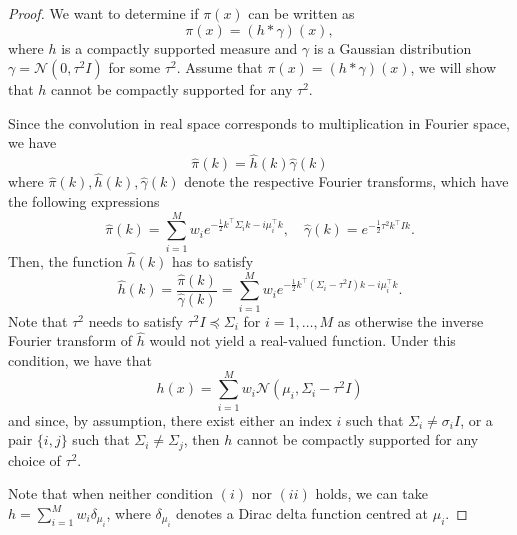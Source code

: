 \begin{proof}
We want to determine if $\pi(x)$ can be written as
\begin{equation*}
    \pi(x) = (h*\gamma)(x),
\end{equation*}
where $h$ is a compactly supported measure and $\gamma$ is a Gaussian distribution $\gamma = \mathcal{N}(0, \tau^2 I)$ for some $\tau^2$. 
Assume that $\pi(x) = (h*\gamma)(x)$, we will show that $h$ cannot be compactly supported for any $\tau^2$.

Since the convolution in real space corresponds to multiplication in Fourier space, we have
\begin{equation*}
    \hat{\pi}(k) = \hat{h}(k)\hat{\gamma}(k)
\end{equation*}
where $ \hat{\pi}(k), \hat{h}(k), \hat{\gamma}(k)$ denote the respective Fourier transforms, which have the following expressions
\begin{equation*}
    \hat{\pi}(k) = \sum_{i=1}^M w_i e^{-\frac{1}{2}k^{\intercal}\Sigma_i k - i \mu_i^{\intercal}k}, \quad  \hat{\gamma}(k) = e^{-\frac{1}{2}\tau^2 k^\intercal I k}.
\end{equation*}
Then, the function $\hat{h}(k)$ has to satisfy
\begin{equation*}
    \hat{h}(k) = \frac{\hat{\pi}(k) }{\hat{\gamma}(k)} = \sum_{i=1}^M w_i e^{-\frac{1}{2}k^\intercal (\Sigma_i-\tau^2 I) k- i \mu_i^\intercal k} .
\end{equation*}
Note that $\tau^2$ needs to satisfy $\tau^2 I\preccurlyeq \Sigma_i$ for $i = 1, \dots, M$ as otherwise the inverse Fourier transform of $\hat{h}$ would not yield a real-valued function. 
Under this condition, we have that 
\begin{equation*}
    h(x) = \sum_{i=1}^M w_i \mathcal{N}(\mu_i, \Sigma_i-\tau^2 I) 
\end{equation*}
and since, by assumption, there exist either an index $i$ such that $\Sigma_i \neq \sigma_i I$, or a pair $\{i, j\}$ such that $\Sigma_i \neq \Sigma_j$, then $h$ cannot be compactly supported for any choice of $\tau^2$.

Note that when neither condition $(i)$ nor $(ii)$ holds, we can take $h = \sum_{i=1}^M w_i\delta_{\mu_i}$, where $\delta_{\mu_i}$ denotes a Dirac delta function centred at $\mu_i$.
\end{proof}


